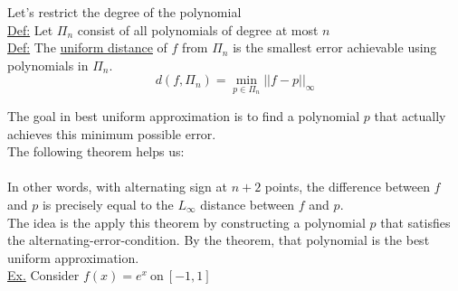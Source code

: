 {Let's restrict the degree of the polynomial \\

\underline{Def:} Let \underline{$\Pi_n$} consist of all polynomials of degree at most $n$ \\

\underline{Def:} The \underline{uniform distance} of $f$ from $\Pi_n$ is the smallest error achievable using polynomials in $\Pi_n$.
\begin{equation*}
    d (f, \Pi_n) = \min_{p \in \Pi_n}{||f - p||_\infty}
\end{equation*}

The goal in best uniform approximation is to find a polynomial $p$ that actually achieves this minimum possible error. \\

The following theorem helps us: \\

\\

In other words, with alternating sign at $n+2$ points, the difference between $f$ and $p$ is precisely equal to the $L_\infty$ distance between $f$ and $p$. \\

The idea is the apply this theorem by constructing a polynomial $p$ that satisfies the alternating-error-condition. By the theorem, that polynomial is the best uniform approximation. \\

\underline{Ex.} Consider $f(x) = e^{x}~\text{on}~[-1, 1]$ \\

}
